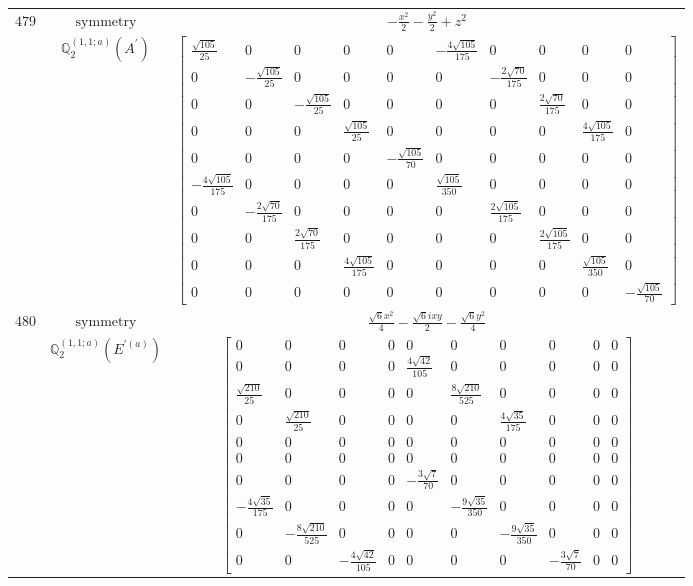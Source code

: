 \documentclass[fleqn,8pt,landscape]{jsarticle}
\begin{document}
\begin{longtable}{ccc}
$ 479 $ & $ \text{symmetry} $ & $ - \frac{x^{2}}{2} - \frac{y^{2}}{2} + z^{2} $ \\
$  $ & $ \mathbb{Q}_{2}^{(1,1;a)}(A^{\prime}) $ & $ \begin{bmatrix} \frac{\sqrt{105}}{25} & 0 & 0 & 0 & 0 & - \frac{4 \sqrt{105}}{175} & 0 & 0 & 0 & 0 \\ 0 & - \frac{\sqrt{105}}{25} & 0 & 0 & 0 & 0 & - \frac{2 \sqrt{70}}{175} & 0 & 0 & 0 \\ 0 & 0 & - \frac{\sqrt{105}}{25} & 0 & 0 & 0 & 0 & \frac{2 \sqrt{70}}{175} & 0 & 0 \\ 0 & 0 & 0 & \frac{\sqrt{105}}{25} & 0 & 0 & 0 & 0 & \frac{4 \sqrt{105}}{175} & 0 \\ 0 & 0 & 0 & 0 & - \frac{\sqrt{105}}{70} & 0 & 0 & 0 & 0 & 0 \\ - \frac{4 \sqrt{105}}{175} & 0 & 0 & 0 & 0 & \frac{\sqrt{105}}{350} & 0 & 0 & 0 & 0 \\ 0 & - \frac{2 \sqrt{70}}{175} & 0 & 0 & 0 & 0 & \frac{2 \sqrt{105}}{175} & 0 & 0 & 0 \\ 0 & 0 & \frac{2 \sqrt{70}}{175} & 0 & 0 & 0 & 0 & \frac{2 \sqrt{105}}{175} & 0 & 0 \\ 0 & 0 & 0 & \frac{4 \sqrt{105}}{175} & 0 & 0 & 0 & 0 & \frac{\sqrt{105}}{350} & 0 \\ 0 & 0 & 0 & 0 & 0 & 0 & 0 & 0 & 0 & - \frac{\sqrt{105}}{70} \end{bmatrix} $ \\ \hline
$ 480 $ & $ \text{symmetry} $ & $ \frac{\sqrt{6} x^{2}}{4} - \frac{\sqrt{6} i x y}{2} - \frac{\sqrt{6} y^{2}}{4} $ \\
$  $ & $ \mathbb{Q}_{2}^{(1,1;a)}(E^{\prime(a)}) $ & $ \begin{bmatrix} 0 & 0 & 0 & 0 & 0 & 0 & 0 & 0 & 0 & 0 \\ 0 & 0 & 0 & 0 & \frac{4 \sqrt{42}}{105} & 0 & 0 & 0 & 0 & 0 \\ \frac{\sqrt{210}}{25} & 0 & 0 & 0 & 0 & \frac{8 \sqrt{210}}{525} & 0 & 0 & 0 & 0 \\ 0 & \frac{\sqrt{210}}{25} & 0 & 0 & 0 & 0 & \frac{4 \sqrt{35}}{175} & 0 & 0 & 0 \\ 0 & 0 & 0 & 0 & 0 & 0 & 0 & 0 & 0 & 0 \\ 0 & 0 & 0 & 0 & 0 & 0 & 0 & 0 & 0 & 0 \\ 0 & 0 & 0 & 0 & - \frac{3 \sqrt{7}}{70} & 0 & 0 & 0 & 0 & 0 \\ - \frac{4 \sqrt{35}}{175} & 0 & 0 & 0 & 0 & - \frac{9 \sqrt{35}}{350} & 0 & 0 & 0 & 0 \\ 0 & - \frac{8 \sqrt{210}}{525} & 0 & 0 & 0 & 0 & - \frac{9 \sqrt{35}}{350} & 0 & 0 & 0 \\ 0 & 0 & - \frac{4 \sqrt{42}}{105} & 0 & 0 & 0 & 0 & - \frac{3 \sqrt{7}}{70} & 0 & 0 \end{bmatrix} $ \\ \hline

\end{longtable}
\end{document}
